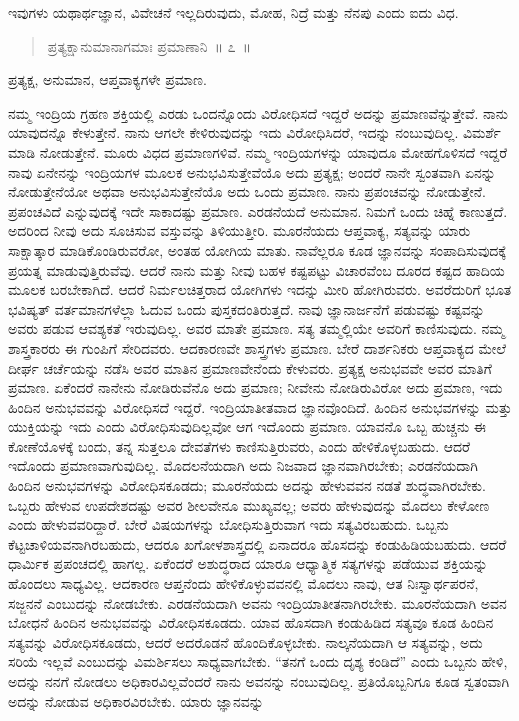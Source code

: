 \vspace{-0.1cm}

ಇವುಗಳು ಯಥಾರ್ಥಜ್ಞಾನ, ವಿವೇಚನೆ ಇಲ್ಲದಿರುವುದು, ಮೋಹ, ನಿದ್ರೆ ಮತ್ತು ನೆನಪು ಎಂದು ಐದು ವಿಧ. 

\vspace{-0.2cm}

\begin{verse}
ಪ್ರತ್ಯಕ್ಷಾನುಮಾನಾಗಮಾಃ ಪ್ರಮಾಣಾನಿ~॥ ೭~॥
\end{verse}

\vspace{-0.1cm}

ಪ್ರತ್ಯಕ್ಷ, ಅನುಮಾನ, ಆಪ್ತವಾಕ್ಯಗಳೇ ಪ್ರಮಾಣ. 

\vskip 6pt

ನಮ್ಮ ಇಂದ್ರಿಯ ಗ್ರಹಣ ಶಕ್ತಿಯಲ್ಲಿ ಎರಡು ಒಂದನ್ನೊಂದು ವಿರೋಧಿಸದೆ ಇದ್ದರೆ ಅದನ್ನು ಪ್ರಮಾಣವೆನ್ನುತ್ತೇವೆ. ನಾನು ಯಾವುದನ್ನೊ ಕೇಳುತ್ತೇನೆ. ನಾನು ಆಗಲೇ ಕೇಳಿರುವುದನ್ನು ಇದು ವಿರೋಧಿಸಿದರೆ, ಇದನ್ನು ನಂಬುವುದಿಲ್ಲ. ವಿಮರ್ಶೆ ಮಾಡಿ ನೋಡುತ್ತೇನೆ. ಮೂರು ವಿಧದ ಪ್ರಮಾಣಗಳಿವೆ. ನಮ್ಮ ಇಂದ್ರಿಯಗಳನ್ನು ಯಾವುದೂ ಮೋಹಗೊಳಿಸದೆ ಇದ್ದರೆ ನಾವು ಏನೇನನ್ನು ಇಂದ್ರಿಯಗಳ ಮೂಲಕ ಅನುಭವಿಸುತ್ತೇವೆಯೊ ಅದು ಪ್ರತ್ಯಕ್ಷ; ಅಂದರೆ ನಾನೇ ಸ್ವಂತವಾಗಿ ಏನನ್ನು ನೋಡುತ್ತೇನೆಯೋ ಅಥವಾ ಅನುಭವಿಸುತ್ತೇನೆಯೊ ಅದು ಒಂದು ಪ್ರಮಾಣ. ನಾನು ಪ್ರಪಂಚವನ್ನು ನೋಡುತ್ತೇನೆ. ಪ್ರಪಂಚವಿದೆ ಎನ್ನುವುದಕ್ಕೆ ಇದೇ ಸಾಕಾದಷ್ಟು ಪ್ರಮಾಣ. ಎರಡನೆಯದೆ ಅನುಮಾನ. ನಿಮಗೆ ಒಂದು ಚಿಹ್ನೆ ಕಾಣುತ್ತದೆ. ಅದರಿಂದ ನೀವು ಅದು ಸೂಚಿಸುವ ವಸ್ತುವನ್ನು ತಿಳಿಯುತ್ತೀರಿ. ಮೂರನೆಯದು ಆಪ್ತವಾಕ್ಯ, ಸತ್ಯವನ್ನು ಯಾರು ಸಾಕ್ಷಾತ್ಕಾರ ಮಾಡಿಕೊಂಡಿರುವರೋ, ಅಂತಹ ಯೋಗಿಯ ಮಾತು. ನಾವೆಲ್ಲರೂ ಕೂಡ ಜ್ಞಾನವನ್ನು ಸಂಪಾದಿಸುವುದಕ್ಕೆ ಪ್ರಯತ್ನ ಮಾಡುವುತ್ತಿರುವೆವು. ಆದರೆ ನಾನು ಮತ್ತು ನೀವು ಬಹಳ ಕಷ್ಟಪಟ್ಟು ವಿಚಾರವೆಂಬ ದೂರದ ಕಷ್ಟದ ಹಾದಿಯ ಮೂಲಕ ಬರಬೇಕಾಗಿದೆ. ಆದರೆ ನಿರ್ಮಲಚಿತ್ತರಾದ ಯೋಗಿಗಳು ಇದನ್ನು ಮೀರಿ ಹೋಗಿರುವರು. ಅವರೆದುರಿಗೆ ಭೂತ ಭವಿಷ್ಯತ್​ ವರ್ತಮಾನಗಳೆಲ್ಲಾ ಓದುವ ಒಂದು ಪುಸ್ತಕದಂತಿರುತ್ತದೆ. ನಾವು ಜ್ಞಾನಾರ್ಜನೆಗೆ ಪಡುವಷ್ಟು ಕಷ್ಟವನ್ನು ಅವರು ಪಡುವ ಆವಶ್ಯಕತೆ ಇರುವುದಿಲ್ಲ. ಅವರ ಮಾತೇ ಪ್ರಮಾಣ. ಸತ್ಯ ತಮ್ಮಲ್ಲಿಯೇ ಅವರಿಗೆ ಕಾಣಿಸುವುದು. ನಮ್ಮ ಶಾಸ್ತ್ರಕಾರರು ಈ ಗುಂಪಿಗೆ ಸೇರಿದವರು. ಆದಕಾರಣವೇ ಶಾಸ್ತ್ರಗಳು ಪ್ರಮಾಣ. ಬೇರೆ ದಾರ್ಶನಿಕರು ಆಪ್ತವಾಕ್ಯದ ಮೇಲೆ ದೀರ್ಘ ಚರ್ಚೆಯನ್ನು ನಡೆಸಿ ಅವರ ಮಾತಿನ ಪ್ರಮಾಣವೇನೆಂದು ಕೇಳುವರು. ಪ್ರತ್ಯಕ್ಷ ಅನುಭವವೇ ಅವರ ಮಾತಿಗೆ ಪ್ರಮಾಣ. ಏಕೆಂದರೆ ನಾನೇನು ನೋಡಿರುವೆನೊ ಅದು ಪ್ರಮಾಣ; ನೀವೇನು ನೋಡಿರುವಿರೋ ಅದು ಪ್ರಮಾಣ, ಇದು ಹಿಂದಿನ ಅನುಭವವನ್ನು ವಿರೋಧಿಸದೆ ಇದ್ದರೆ. ಇಂದ್ರಿಯಾತೀತವಾದ ಜ್ಞಾನವೊಂದಿದೆ. ಹಿಂದಿನ ಅನುಭವಗಳನ್ನು ಮತ್ತು ಯುಕ್ತಿಯನ್ನು ಇದು ಎಂದು ವಿರೋಧಿಸುವುದಿಲ್ಲವೋ ಆಗ ಇದೊಂದು ಪ್ರಮಾಣ. ಯಾವನೊ ಒಬ್ಬ ಹುಚ್ಚನು ಈ ಕೋಣೆಯೊಳಕ್ಕೆ ಬಂದು, ತನ್ನ ಸುತ್ತಲೂ ದೇವತೆಗಳು ಕಾಣಿಸುತ್ತಿರುವರು, ಎಂದು ಹೇಳಿಕೊಳ್ಳಬಹುದು. ಆದರೆ ಇದೊಂದು ಪ್ರಮಾಣವಾಗುವುದಿಲ್ಲ. ಮೊದಲನೆಯದಾಗಿ ಅದು ನಿಜವಾದ ಜ್ಞಾನವಾಗಿರಬೇಕು; ಎರಡನೆಯದಾಗಿ ಹಿಂದಿನ ಅನುಭವಗಳನ್ನು ವಿರೋಧಿಸಕೂಡದು; ಮೂರನೆಯದು ಅದನ್ನು ಹೇಳುವವನ ನಡತೆ ಶುದ್ಧವಾಗಿರಬೇಕು. ಒಬ್ಬರು ಹೇಳುವ ಉಪದೇಶದಷ್ಟು ಅವರ ಶೀಲವೇನೂ ಮುಖ್ಯವಲ್ಲ; ಅವರು ಹೇಳುವುದನ್ನು ಮೊದಲು ಕೇಳೋಣ ಎಂದು ಹೇಳುವವರಿದ್ದಾರೆ. ಬೇರೆ ವಿಷಯಗಳನ್ನು ಬೋಧಿಸುತ್ತಿರುವಾಗ ಇದು ಸತ್ಯವಿರಬಹುದು. ಒಬ್ಬನು ಕೆಟ್ಟಚಾಳಿಯವನಾಗಿರಬಹುದು, ಆದರೂ ಖಗೋಳಶಾಸ್ತ್ರದಲ್ಲಿ ಏನಾದರೂ ಹೊಸದನ್ನು ಕಂಡುಹಿಡಿಯಬಹುದು. ಆದರೆ ಧಾರ್ಮಿಕ ಪ್ರಪಂಚದಲ್ಲಿ ಹಾಗಲ್ಲ. ಏಕೆಂದರೆ ಅಶುದ್ಧರಾದ ಯಾರೂ ಆಧ್ಯಾತ್ಮಿಕ ಸತ್ಯಗಳನ್ನು ಪಡೆಯುವ ಶಕ್ತಿಯನ್ನು ಹೊಂದಲು ಸಾಧ್ಯವಿಲ್ಲ. ಆದಕಾರಣ ಆಪ್ತನೆಂದು ಹೇಳಿಕೊಳ್ಳುವವನಲ್ಲಿ ಮೊದಲು ನಾವು, ಆತ ನಿಃಸ್ವಾರ್ಥಪರನೆ, ಸಜ್ಜನನೆ ಎಂಬುದನ್ನು ನೋಡಬೇಕು. ಎರಡನೆಯದಾಗಿ ಅವನು ಇಂದ್ರಿಯಾತೀತನಾಗಿರಬೇಕು. ಮೂರನೆಯದಾಗಿ ಅವನ ಬೋಧನೆ ಹಿಂದಿನ ಅನುಭವವನ್ನು ವಿರೋಧಿಸಕೂಡದು. ಯಾವ ಹೊಸದಾಗಿ ಕಂಡುಹಿಡಿದ ಸತ್ಯವೂ ಕೂಡ ಹಿಂದಿನ ಸತ್ಯವನ್ನು ವಿರೋಧಿಸಕೂಡದು, ಆದರೆ ಅದರೊಡನೆ ಹೊಂದಿಕೊಳ್ಳಬೇಕು. ನಾಲ್ಕನೆಯದಾಗಿ ಆ ಸತ್ಯವನ್ನು, ಅದು ಸರಿಯೆ ಇಲ್ಲವೆ ಎಂಬುದನ್ನು ವಿಮರ್ಶಿಸಲು ಸಾಧ್ಯವಾಗಬೇಕು. “ತನಗೆ ಒಂದು ದೃಶ್ಯ ಕಂಡಿದೆ” ಎಂದು ಒಬ್ಬನು ಹೇಳಿ, ಅದನ್ನು ನನಗೆ ನೋಡಲು ಅಧಿಕಾರವಿಲ್ಲವೆಂದರೆ ನಾನು ಅವನನ್ನು ನಂಬುವುದಿಲ್ಲ. ಪ್ರತಿಯೊಬ್ಬನಿಗೂ ಕೂಡ ಸ್ವತಂವಾಗಿ ಅದನ್ನು ನೋಡುವ ಅಧಿಕಾರವಿರಬೇಕು. ಯಾರು ಜ್ಞಾನವನ್ನು 